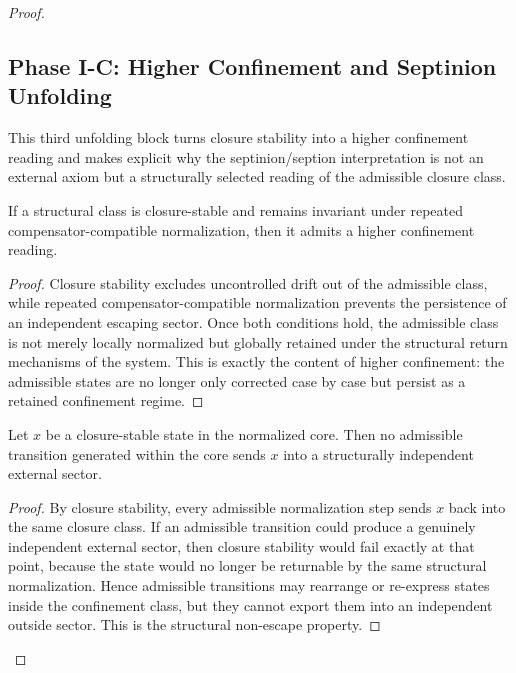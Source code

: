 \begin{proof}
\subsection*{Phase I-C: Higher Confinement and Septinion Unfolding}

This third unfolding block turns closure stability into a higher confinement
reading and makes explicit why the septinion/seption interpretation is not an
external axiom but a structurally selected reading of the admissible closure
class.

\begin{lemma}
\label{lem:higher-confinement-lemma}
If a structural class is closure-stable and remains invariant under repeated
compensator-compatible normalization, then it admits a higher confinement
reading.
\end{lemma}

\begin{proof}
Closure stability excludes uncontrolled drift out of the admissible class, while
repeated compensator-compatible normalization prevents the persistence of an
independent escaping sector. Once both conditions hold, the admissible class is
not merely locally normalized but globally retained under the structural return
mechanisms of the system. This is exactly the content of higher confinement:
the admissible states are no longer only corrected case by case but persist as a
retained confinement regime.
\end{proof}

\begin{lemma}
\label{lem:non-escape-lemma}
Let $x$ be a closure-stable state in the normalized core. Then no admissible
transition generated within the core sends $x$ into a structurally independent
external sector.
\end{lemma}

\begin{proof}
By closure stability, every admissible normalization step sends $x$ back into
the same closure class. If an admissible transition could produce a genuinely
independent external sector, then closure stability would fail exactly at that
point, because the state would no longer be returnable by the same structural
normalization. Hence admissible transitions may rearrange or re-express states
inside the confinement class, but they cannot export them into an independent
outside sector. This is the structural non-escape property.
\end{proof}


\end{proof}

